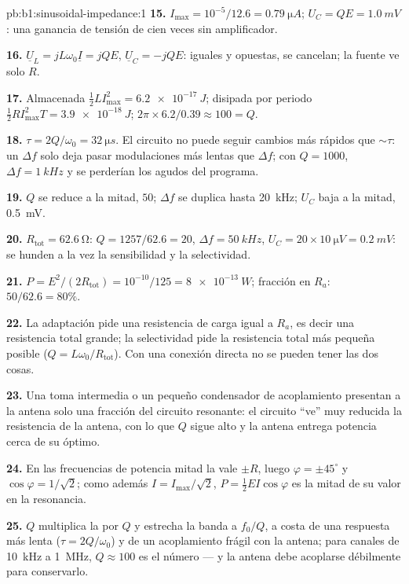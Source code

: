 \begin{solution}{pb:b1:sinusoidal-impedance:1}
\textbf{15.} $I_{\max} = 10^{-5}/12.6 = \qty{0.79}{\micro A}$; $U_C = QE =
\qty{1.0}{mV}$: una ganancia de tensión de cien veces sin amplificador.

\textbf{16.} $\underline U_L = jL\omega_0\underline I = jQE$, $\underline U_C
= -jQE$: iguales y opuestas, se cancelan; la fuente ve solo $R$.

\textbf{17.} Almacenada $\tfrac12 LI_{\max}^2 = \qty{6.2e-17}{J}$; disipada
por periodo $\tfrac12 RI_{\max}^2T = \qty{3.9e-18}{J}$; $2\pi \times 6.2/0.39
\approx 100 = Q$.

\textbf{18.} $\tau = 2Q/\omega_0 = \qty{32}{\micro s}$. El circuito no
puede seguir cambios más rápidos que $\sim\tau$: un 
$\Delta f$ solo deja pasar modulaciones más lentas que $\Delta f$; con
$Q = 1000$, $\Delta f =
\qty{1}{kHz}$ y se perderían los agudos del programa.

\textbf{19.} $Q$ se reduce a la mitad, $50$; $\Delta f$ se duplica hasta
\qty{20}{kHz}; $U_C$ baja a la mitad, \qty{0.5}{mV}.

\textbf{20.} $R_{\text{tot}} = \qty{62.6}{\ohm}$: $Q = 1257/62.6 = 20$,
$\Delta f = \qty{50}{kHz}$, $U_C = 20 \times \qty{10}{\micro V} = \qty{0.2}{mV}$:
se hunden a la vez la sensibilidad y la selectividad.

\textbf{21.} $P = E^2/(2R_{\text{tot}}) = 10^{-10}/125 = \qty{8e-13}{W}$;
fracción en $R_a$: $50/62.6 = 80\%$.

\textbf{22.} La adaptación pide una resistencia de carga igual a $R_a$, es
decir una resistencia total grande; la selectividad pide la resistencia
total más pequeña posible ($Q = L\omega_0/R_{\text{tot}}$). Con una
conexión directa no se pueden tener las dos cosas.

\textbf{23.} Una toma intermedia o un pequeño condensador de acoplamiento
presentan a la antena solo una fracción del circuito resonante: el
circuito ``ve'' muy reducida la resistencia de la antena, con lo que $Q$
sigue alto y la antena entrega potencia cerca de su óptimo.

\textbf{24.} En las frecuencias de potencia mitad la  vale
$\pm R$, luego $\varphi = \pm45^\circ$ y $\cos\varphi = 1/\sqrt2$; como
además $I =
I_{\max}/\sqrt2$, $P = \tfrac12 EI\cos\varphi$ es la mitad de su valor en
la resonancia.

\textbf{25.} $Q$ multiplica la  por $Q$ y estrecha la banda a
$f_0/Q$, a costa de una respuesta más lenta ($\tau = 2Q/\omega_0$) y de un
acoplamiento frágil con la antena; para canales de \qty{10}{kHz} a
\qty{1}{MHz}, $Q \approx 100$ es el número --- y la antena debe acoplarse
débilmente para conservarlo.
\end{solution}
